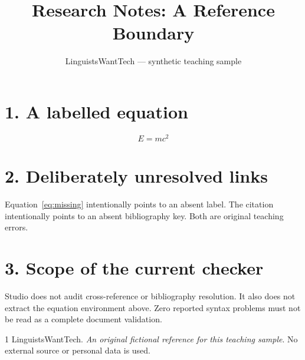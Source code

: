 \documentclass[12pt]{article}
\title{Research Notes: A Reference Boundary}
\author{LinguistsWantTech --- synthetic teaching sample}
\date{}
\begin{document}
\maketitle
\section*{1. A labelled equation}
\begin{equation}
E=mc^2
\label{eq:energy}
\end{equation}
\section*{2. Deliberately unresolved links}
Equation~\eqref{eq:missing} intentionally points to an absent label.
The citation~\cite{missing-note} intentionally points to an absent
bibliography key. Both are original teaching errors.
\section*{3. Scope of the current checker}
Studio does not audit cross-reference or bibliography resolution.
It also does not extract the equation environment above. Zero reported
syntax problems must not be read as a complete document validation.
\begin{thebibliography}{1}
 LinguistsWantTech.
\emph{An original fictional reference for this teaching sample}.
No external source or personal data is used.
\end{thebibliography}
\end{document}
